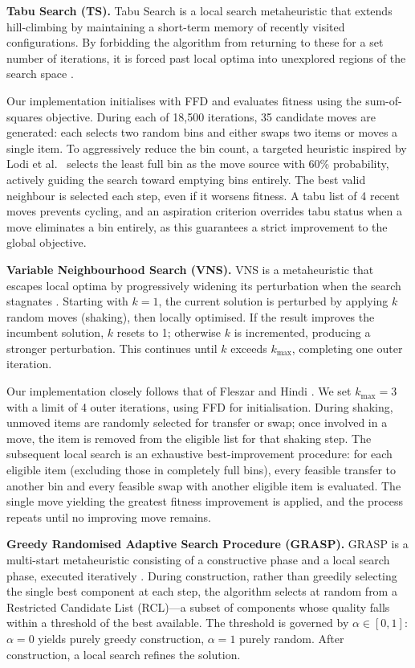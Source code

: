 \documentclass[11pt]{article}
\begin{document}
\textbf{Tabu Search (TS).} Tabu Search is a local search metaheuristic that extends hill-climbing by maintaining a short-term memory of recently visited configurations. By forbidding the algorithm from returning to these for a set number of iterations, it is forced past local optima into unexplored regions of the search space \cite{gendreau}.

Our implementation initialises with FFD and evaluates fitness using the sum-of-squares objective. During each of 18,500 iterations, 35 candidate moves are generated: each selects two random bins and either swaps two items or moves a single item. To aggressively reduce the bin count, a targeted heuristic inspired by Lodi et al.\ \cite{lodi} selects the least full bin as the move source with 60\% probability, actively guiding the search toward emptying bins entirely. The best valid neighbour is selected each step, even if it worsens fitness. A tabu list of 4 recent moves prevents cycling, and an aspiration criterion overrides tabu status when a move eliminates a bin entirely, as this guarantees a strict improvement to the global objective.

\textbf{Variable Neighbourhood Search (VNS).} VNS is a metaheuristic that escapes local optima by progressively widening its perturbation when the search stagnates \cite{gendreau}. Starting with $k = 1$, the current solution is perturbed by applying $k$ random moves (shaking), then locally optimised. If the result improves the incumbent solution, $k$ resets to 1; otherwise $k$ is incremented, producing a stronger perturbation. This continues until $k$ exceeds $k_{\max}$, completing one outer iteration.

Our implementation closely follows that of Fleszar and Hindi \cite{kryz}. We set $k_{\max} = 3$ with a limit of 4 outer iterations, using FFD for initialisation. During shaking, unmoved items are randomly selected for transfer or swap; once involved in a move, the item is removed from the eligible list for that shaking step. The subsequent local search is an exhaustive best-improvement procedure: for each eligible item (excluding those in completely full bins), every feasible transfer to another bin and every feasible swap with another eligible item is evaluated. The single move yielding the greatest fitness improvement is applied, and the process repeats until no improving move remains.

\textbf{Greedy Randomised Adaptive Search Procedure (GRASP).} GRASP is a multi-start metaheuristic consisting of a constructive phase and a local search phase, executed iteratively \cite{gendreau}. During construction, rather than greedily selecting the single best component at each step, the algorithm selects at random from a Restricted Candidate List (RCL)---a subset of components whose quality falls within a threshold of the best available. The threshold is governed by $\alpha \in [0,1]$: $\alpha = 0$ yields purely greedy construction, $\alpha = 1$ purely random. After construction, a local search refines the solution.
\end{document}
